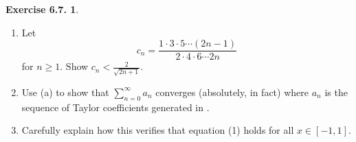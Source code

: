 \documentclass[12pt]{article}
\theoremstyle{definition}
\theoremstyle{exercise}
\newtheorem{exercise}{Exercise 6.7.}
\theoremstyle{solution}
\begin{document}
\begin{exercise}
\label{ex:6}
    \begin{enumerate}
        \item Let
        \[
            c_n = \frac{1 \cdot 3 \cdot 5 \cdots (2n - 1)}{2 \cdot 4 \cdot 6 \cdots 2n}
        \]
        for \( n \geq 1 \). Show \( c_n < \frac{2}{\sqrt{2n + 1}} \).

        \item Use (a) to show that \( \sum_{n=0}^{\infty} a_n \) converges (absolutely, in fact) where \( a_n \) is the sequence of Taylor coefficients generated in .

        \item Carefully explain how this verifies that equation (1) holds for all \( x \in [-1, 1] \).
    \end{enumerate}
\end{exercise}
\end{document}
